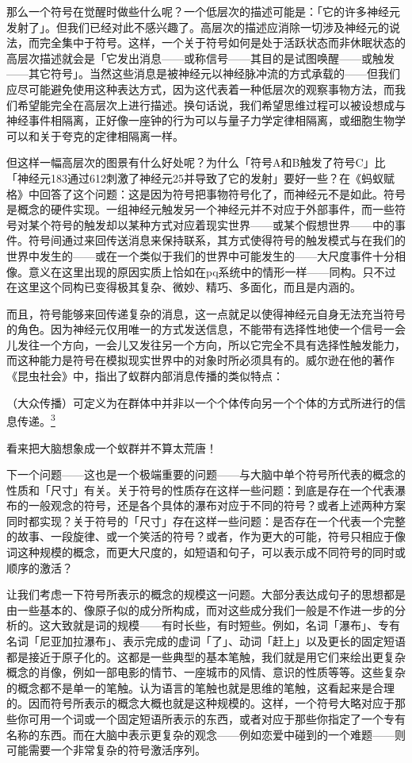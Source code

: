 \documentclass[
  12pt,
  twoside,
  openright,
  oldfontcommands,
]{memoir}
\newenvironment{fsquote}{%
  \begin{mdframed}[style=gebquote]\kaitifamily\small%
}{%
  \end{mdframed}%
}
\begin{document}
那么一个符号在觉醒时做些什么呢？一个低层次的描述可能是：「它的许多神经元发射了」。但我们已经对此不感兴趣了。高层次的描述应消除一切涉及神经元的说法，而完全集中于符号。这样，一个关于符号如何是处于活跃状态而非休眠状态的高层次描述就会是「它发出消息------或称信号------其目的是试图唤醒------或触发------其它符号」。当然这些消息是被神经元以神经脉冲流的方式承载的------但我们应尽可能避免使用这种表达方式，因为这代表着一种低层次的观察事物方法，而我们希望能完全在高层次上进行描述。换句话说，我们希望思维过程可以被设想成与神经事件相隔离，正好像一座钟的行为可以与量子力学定律相隔离，或细胞生物学可以和关于夸克的定律相隔离一样。

但这样一幅高层次的图景有什么好处呢？为什么「符号A和B触发了符号C」比「神经元183通过612刺激了神经元25并导致了它的发射」要好一些？在《蚂蚁赋格》中回答了这个问题：这是因为符号把事物符号化了，而神经元不是如此。符号是概念的硬件实现。一组神经元触发另一个神经元并不对应于外部事件，而一些符号对某个符号的触发却以某种方式对应着现实世界------或某个假想世界------中的事件。符号间通过来回传送消息来保持联系，其方式使得符号的触发模式与在我们的世界中发生的------或在一个类似于我们的世界中可能发生的------大尺度事件十分相像。意义在这里出现的原因实质上恰如在pq系统中的情形一样------同构。只不过在这里这个同构已变得极其复杂、微妙、精巧、多面化，而且是内涵的。

而且，符号能够来回传递复杂的消息，这一点就足以使得神经元自身无法充当符号的角色。因为神经元仅用唯一的方式发送信息，不能带有选择性地使一个信号一会儿发往一个方向，一会儿又发往另一个方向，所以它完全不具有选择性触发能力，而这种能力是符号在模拟现实世界中的对象时所必须具有的。威尔逊在他的著作《昆虫社会》中，指出了蚁群内部消息传播的类似特点：

\begin{fsquote}
（大众传播）可定义为在群体中并非以一个个体传向另一个个体的方式所进行的信息传递。\hyperref[fn:Chapter11-3]{\textsuperscript{3}}
\end{fsquote}

看来把大脑想象成一个蚁群并不算太荒唐！

下一个问题------这也是一个极端重要的问题------与大脑中单个符号所代表的概念的性质和「尺寸」有关。关于符号的性质存在这样一些问题：到底是存在一个代表瀑布的一般观念的符号，还是各个具体的瀑布对应于不同的符号？或者上述两种方案同时都实现？关于符号的「尺寸」存在这样一些问题：是否存在一个代表一个完整的故事、一段旋律、或一个笑活的符号？或者，作为更大的可能，符号只相应于像词这种规模的概念，而更大尺度的，如短语和句子，可以表示成不同符号的同时或顺序的激活？

让我们考虑一下符号所表示的概念的规模这一问题。大部分表达成句子的思想都是由一些基本的、像原子似的成分所构成，而对这些成分我们一般是不作进一步的分析的。这大致就是词的规模------有时长些，有时短些。例如，名词「瀑布」、专有名词「尼亚加拉瀑布」、表示完成的虚词「了」、动词「赶上」以及更长的固定短语都是接近于原子化的。这都是一些典型的基本笔触，我们就是用它们来绘出更复杂概念的肖像，例如一部电影的情节、一座城市的风情、意识的性质等等。这些复杂的概念都不是单一的笔触。认为语言的笔触也就是思维的笔触，这看起来是合理的。因而符号所表示的概念大概也就是这种规模的。这样，一个符号大略对应于那些你可用一个词或一个固定短语所表示的东西，或者对应于那些你指定了一个专有名称的东西。而在大脑中表示更复杂的观念------例如恋爱中碰到的一个难题------则可能需要一个非常复杂的符号激活序列。
\end{document}
